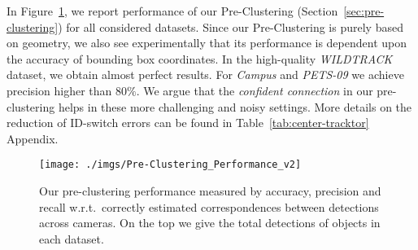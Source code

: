 In Figure~\ref{fig:result-2Dclustering}, we report performance of our Pre-Clustering (Section~\ref{sec:pre-clustering}) for all considered datasets.
Since our Pre-Clustering is purely based on geometry, we also see experimentally that its performance is dependent upon the accuracy of bounding box coordinates.
In the high-quality \textit{WILDTRACK} dataset, we obtain almost perfect results.
For \textit{Campus} and \textit{PETS-09} we achieve precision higher than $80\%$.
We argue that the \textit{confident connection} in our pre-clustering helps in these more challenging and noisy settings.
More details on the reduction of ID-switch errors can be found in Table~\ref{tab:center-tracktor} Appendix.
\vspace{-0.15in}
\begin{figure}[!hbt]
\centering
\texttt{[image: ./imgs/Pre-Clustering\_Performance\_v2]}
\vspace{-0.15in}
\caption{Our pre-clustering performance measured by accuracy, precision and recall w.r.t.\ correctly estimated correspondences between detections across cameras. On the top we give the total detections of objects in each dataset.
}
\label{fig:result-2Dclustering}
\vspace{-0.2in}
\end{figure}


